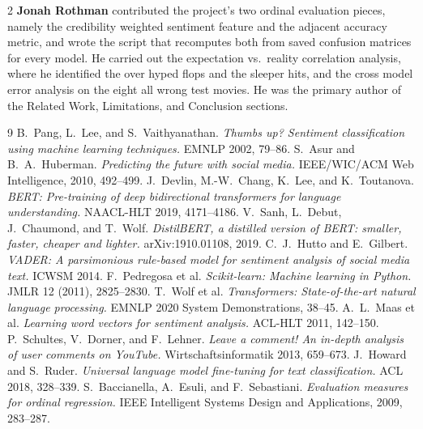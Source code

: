 \documentclass[10pt,letterpaper]{article}
\begin{document}
\begin{multicols}{2}
\textbf{Jonah Rothman} contributed the project's two ordinal evaluation pieces, namely the credibility weighted sentiment feature and the adjacent accuracy metric, and wrote the script that recomputes both from saved confusion matrices for every model. He carried out the expectation vs.\ reality correlation analysis, where he identified the over hyped flops and the sleeper hits, and the cross model error analysis on the eight all wrong test movies. He was the primary author of the Related Work, Limitations, and Conclusion sections.


\begin{thebibliography}{9}
 B.~Pang, L.~Lee, and S.~Vaithyanathan. \textit{Thumbs up? Sentiment classification using machine learning techniques.} EMNLP 2002, 79--86.
 S.~Asur and B.~A.~Huberman. \textit{Predicting the future with social media.} IEEE/WIC/ACM Web Intelligence, 2010, 492--499.
 J.~Devlin, M.-W.~Chang, K.~Lee, and K.~Toutanova. \textit{BERT: Pre-training of deep bidirectional transformers for language understanding.} NAACL-HLT 2019, 4171--4186.
 V.~Sanh, L.~Debut, J.~Chaumond, and T.~Wolf. \textit{DistilBERT, a distilled version of BERT: smaller, faster, cheaper and lighter.} arXiv:1910.01108, 2019.
 C.~J.~Hutto and E.~Gilbert. \textit{VADER: A parsimonious rule-based model for sentiment analysis of social media text.} ICWSM 2014.
 F.~Pedregosa et al. \textit{Scikit-learn: Machine learning in Python.} JMLR 12 (2011), 2825--2830.
 T.~Wolf et al. \textit{Transformers: State-of-the-art natural language processing.} EMNLP 2020 System Demonstrations, 38--45.
 A.~L.~Maas et al. \textit{Learning word vectors for sentiment analysis.} ACL-HLT 2011, 142--150.
 P.~Schultes, V.~Dorner, and F.~Lehner. \textit{Leave a comment! An in-depth analysis of user comments on YouTube.} Wirtschaftsinformatik 2013, 659--673.
 J.~Howard and S.~Ruder. \textit{Universal language model fine-tuning for text classification.} ACL 2018, 328--339.
 S.~Baccianella, A.~Esuli, and F.~Sebastiani. \textit{Evaluation measures for ordinal regression.} IEEE Intelligent Systems Design and Applications, 2009, 283--287.
\end{thebibliography}

\end{multicols}
\end{document}
